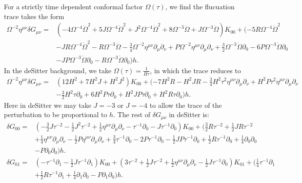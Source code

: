 \documentclass[10pt,letterpaper]{article}
\begin{document}
For a strictly time dependent conformal factor $\Omega(\tau)$, we find the flucuation trace takes the form 
\begin{align}
\Omega^{-2}\eta^{\mu\nu}\delta G_{\mu\nu}={}&(-4 \Omega^{-4} \dot{\Omega}^2
 + 5 J \Omega^{-4} \dot{\Omega}^2
 + J^2 \Omega^{-4} \dot{\Omega}^2
 + 8 \Omega^{-3} \ddot{\Omega}
 + J \Omega^{-3} \ddot{\Omega}) K_{00}
 + (-5 R \Omega^{-4} \dot{\Omega}^2\nonumber\\
& -  J R \Omega^{-4} \dot{\Omega}^2
 -  R \Omega^{-3} \ddot{\Omega}
 -  \tfrac{3}{4} \Omega^{-2} \eta^{\mu \nu} \partial_{\mu} \partial_{\nu}
 + P \Omega^{-2} \eta^{\mu \nu} \partial_{\mu} \partial_{\nu}
 + \tfrac{3}{2} \Omega^{-3} \dot{\Omega} \partial_{0}
 - 6 P \Omega^{-3} \dot{\Omega} \partial_{0}\nonumber\\
& -  J P \Omega^{-3} \dot{\Omega} \partial_{0}
 -  R \Omega^{-3} \dot{\Omega} \partial_{0}) h.
\end{align}
In the deSitter background, we take $\Omega(\tau) = \frac{1}{H\tau}$, in which the trace reduces to 
\begin{align}
\Omega^{-2}\eta^{\mu\nu}\delta G_{\mu\nu}={}&(12 H^2
 + 7 H^2 J
 + H^2 J^2) K_{00}
 + (-7 H^2 R
 -  H^2 J R
 -  \tfrac{3}{4} H^2 \tau^2 \eta^{\mu \nu} \partial_{\mu} \partial_{\nu}
 + H^2 P \tau^2 \eta^{\mu \nu} \partial_{\mu} \partial_{\nu}\nonumber\\
& -  \tfrac{3}{2} H^2 \tau \partial_{0}
 + 6 H^2 P \tau \partial_{0}
 + H^2 J P \tau \partial_{0}
 + H^2 R \tau \partial_{0}) h.
\end{align}
Here in deSitter we may take $J=-3$ or $J=-4$ to allow the trace of the perturbation to be proportional to $h$. The rest of $\delta G_{\mu\nu}$ in deSitter is:
\begin{align}
\delta G_{00}={}&(- \tfrac{3}{2} J \tau^{-2}
 -  \tfrac{1}{2} J^2 \tau^{-2}
 + \tfrac{1}{2} \eta^{\mu \nu} \partial_{\mu} \partial_{\nu}
 -  \tau^{-1} \partial_{0}
 -  J \tau^{-1} \partial_{0}) K_{00}
 + (\tfrac{3}{2} R \tau^{-2}
 + \tfrac{1}{2} J R \tau^{-2}\nonumber\\
& + \tfrac{1}{4} \eta^{\mu \nu} \partial_{\mu} \partial_{\nu}
 -  \tfrac{1}{2} P \eta^{\mu \nu} \partial_{\mu} \partial_{\nu}
 + \tfrac{3}{4} \tau^{-1} \partial_{0}
 - 2 P \tau^{-1} \partial_{0}
 -  \tfrac{1}{2} J P \tau^{-1} \partial_{0}
 + \tfrac{1}{2} R \tau^{-1} \partial_{0}
 + \tfrac{1}{4} \partial_{0} \partial_{0}\nonumber\\
& -  P \partial_{0} \partial_{0}) h.
\end{align}
\begin{align}
\delta G_{01}={}&(- \tau^{-1} \partial_{1}
 -  \tfrac{1}{2} J \tau^{-1} \partial_{1}) K_{00}
 + (3 \tau^{-2}
 + \tfrac{1}{2} J \tau^{-2}
 + \tfrac{1}{2} \eta^{\mu \nu} \partial_{\mu} \partial_{\nu}
 -  \tfrac{1}{2} J \tau^{-1} \partial_{0}) K_{01}
 + (\tfrac{1}{4} \tau^{-1} \partial_{1}\nonumber\\
& + \tfrac{1}{2} R \tau^{-1} \partial_{1}
 + \tfrac{1}{4} \partial_{1} \partial_{0}
 -  P \partial_{1} \partial_{0}) h.
\end{align}
\end{document}
